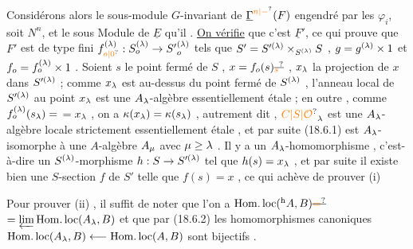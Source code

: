 Considérons alors le sous-module
 $G$-invariant de $\underline{\Gamma}^{\unsure{n|-}}(F)$ engendré
par les $\varphi_i$, soit $N^n$, et le sous
Module de $\underline E$ qu'il . \uline{On
vérifie}  que c'est $\underline F'$, ce qui
prouve que $F'$ est de type fini
$f_{\unsure{o|0}}^{(\handwritten{\lambda})}:S_o^{(\handwritten{\lambda})}\to {S'}_o^{(\handwritten{\lambda})}$ tels que $S'=S'^{(\lambda)}\times_{S^{(\lambda)}}S$ , $g=g^{(\lambda)}\times 1$ et $f_o=f_o^{(\lambda)}\times 1$ . 
Soient $s$ le point fermé de $S$ , $x=f_o(s)\deleted{\unsure{{}_s}}$ , $x_{\lambda}$ la projection de $x$ dans $S'^{(\lambda)}$ ;
comme $x_{\lambda}$ est au-dessus du point fermé de $S^{(\lambda)}$ , l'anneau local  de $S'^{(\lambda)}$ au
point $x_{\lambda}$ est une $A_{\lambda}$-algèbre essentiellement étale ; en outre , comme $f_o^{(\lambda)}(s_{\lambda})=$
$=x_{\lambda}$ , on a $\kappa(x_{\lambda})=\kappa(s_{\lambda})$ , autrement dit , $\unsure{C|S|\mathcal{O}}_{\handwritten{\lambda}}$ est une $A_{\lambda}$-algèbre locale strictement
essentiellement étale , et par suite (18.6.1) est $A_{\lambda}$-isomorphe à une
$A$-algèbre $A_{\mu}$ avec $\mu\geq\lambda$ . Il y a   un $A_{\lambda}$-homomorphisme   , c'est-à-dire
un $S^{(\lambda)}$-morphisme $h:S\to S'^{(\lambda)}$ tel que $h(s)=x_{\lambda}$ , et par suite il existe
bien une $S$-section $f$ de $S'$ telle que $f(s)=x$ , ce qui achève de prouver (i) 

Pour prouver (ii) , il suffit de noter que l'on a $\operatorname{Hom.loc}({}^{\mathrm h}A,B)\deleted{\unsure{=}}$
\margin{\handwritten{$\simeq$}}
$=\varprojlim\operatorname{Hom.loc}(A_{\lambda},B)$ et que par (18.6.2) les homomorphismes canoniques
$\operatorname{Hom.loc}(A_{\lambda},B)\longleftarrow\operatorname{Hom.loc}(A,B)$ sont bijectifs .

